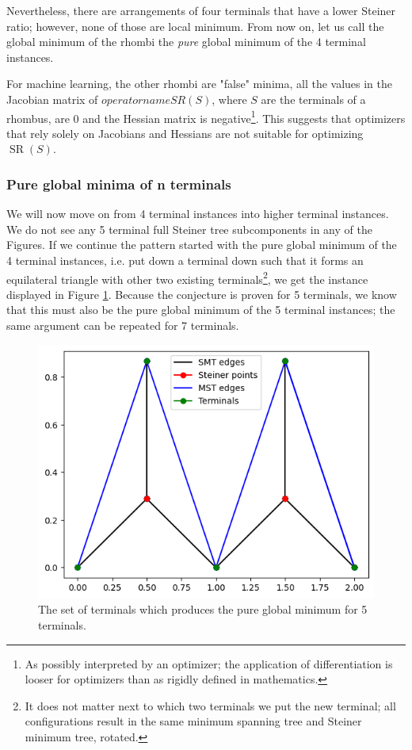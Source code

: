 \documentclass{mpaper}
\begin{document}
Nevertheless, there are arrangements of four terminals that have a lower Steiner ratio; however, none of those are local minimum. From now on, let us call the global minimum of the rhombi the  \emph{pure} global minimum of the 4 terminal instances. 

For machine learning, the other rhombi are "false" minima, all the values in the Jacobian matrix of $operatorname{SR}(S)$, where $S$ are the terminals of a rhombus, are 0 and the Hessian matrix is negative\footnote{As possibly interpreted by an optimizer; the application of differentiation is looser for optimizers than as rigidly defined in mathematics.}. This suggests that optimizers that rely solely on Jacobians and Hessians are not suitable for optimizing $\operatorname{SR}(S)$.

\subsubsection{Pure global minima of n terminals}
We will now move on from 4 terminal instances into higher terminal instances. We do not see any 5 terminal full Steiner tree subcomponents in any of the Figures. If we continue the pattern started with the pure global minimum of the 4 terminal instances, i.e. put down a terminal down such that it forms an equilateral triangle with other two existing terminals\footnote{It does not matter next to which two terminals we put the new terminal; all configurations result in the same minimum spanning tree and Steiner minimum tree, rotated.}, we get the instance displayed in Figure \ref{fig:13}. Because the conjecture is proven for 5 terminals, we know that this must also be the pure global minimum of the 5 terminal instances; the same argument can be repeated for 7 terminals.

\begin{figure}[h!]
  \begin{center}
  \includegraphics[scale=0.5]{plot12.png}
  \end{center}
  \caption{\label{fig:13} The set of terminals which produces the pure global minimum for 5 terminals.}
\end{figure}
\end{document}
